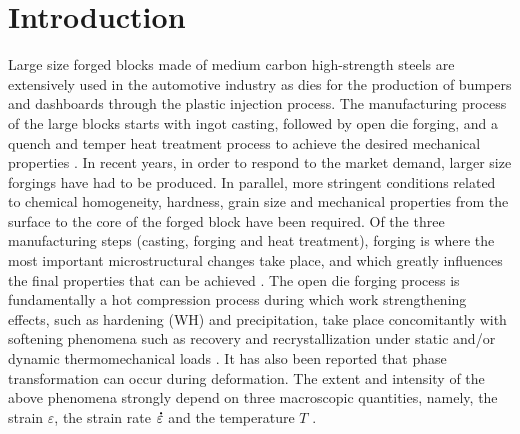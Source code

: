 \documentclass[metals,article,submit,pdftex,moreauthors]{Definitions/mdpi}
\DeclareRobustCommand{\mdot}[1]{\accentset{\mbox{\bfseries .}}{#1}}
\begin{document}
\section{Introduction\label{sec:Introduction}}
Large size forged blocks made of medium carbon high-strength steels are extensively used in the automotive industry as dies for the production of bumpers and dashboards through the plastic injection process.
The manufacturing process of the large blocks starts with ingot casting, followed by open die forging, and a quench and temper heat treatment process to achieve the desired mechanical properties \cite{chadha2017deformation, chadha2018influence, murugesan2019two}.
In recent years, in order to respond to the market demand, larger size forgings have had to be produced.
In parallel, more stringent conditions related to chemical homogeneity, hardness, grain size and mechanical properties from the surface to the core of the forged block have been required.
Of the three manufacturing steps (casting, forging and heat treatment), forging is where the most important microstructural changes take place, and which greatly influences the final properties that can be achieved \cite{murugesan2019hybrid, chadha2020microstructure, sripada2022effect}.
The open die forging process is fundamentally a hot compression process during which work strengthening effects, such as hardening (WH) and precipitation, take place concomitantly with softening phenomena such as recovery and recrystallization under static and/or dynamic thermomechanical loads \cite{tian2022deformation, tavakoli2019ferrite}.
It has also been reported that phase transformation can occur during deformation.
The extent and intensity of the above phenomena strongly depend on three macroscopic quantities, namely, the strain $\varepsilon$, the strain rate $\mdot\varepsilon$ and the temperature $T$ \cite{ebrahimi2017flow, shi2022constitutive, zeng2022constitutive, rudra2019constitutive}.
\end{document}
